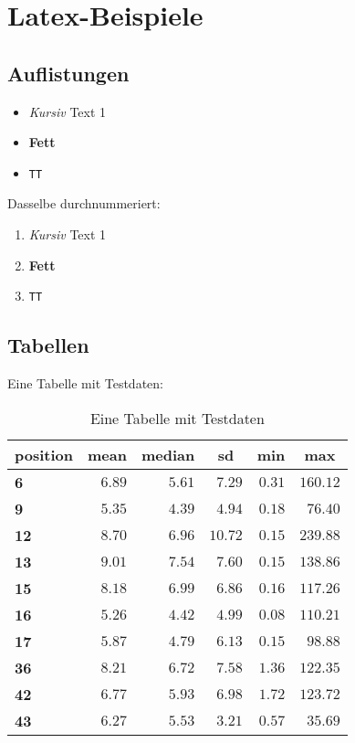
\chapter{Latex-Beispiele}
\label{chap:bsp}

\section{Auflistungen}

\begin{itemize}
	\item \textit{Kursiv} Text 1
	\item \textbf{Fett}  
	\item \texttt{TT} 
\end{itemize}

Dasselbe durchnummeriert:

\begin{enumerate}
	\item \textit{Kursiv} Text 1
	\item \textbf{Fett}  
	\item \texttt{TT} 
\end{enumerate}

\newpage
\section{Tabellen}

Eine Tabelle mit Testdaten:


\begin{table}[H]
	\begin{center}
		\begin{tabular}{lrrrrr}\hline\hline
			\multicolumn{1}{l}{\textbf{position}}&
			\multicolumn{1}{c}{\textbf{mean}}&
			\multicolumn{1}{c}{\textbf{median}}&
			\multicolumn{1}{c}{\textbf{sd}}&
			\multicolumn{1}{c}{\textbf{min}}&
			\multicolumn{1}{c}{\textbf{max}}
			\\ \hline
			\textbf{6}&$6.89$&$5.61$&$ 7.29$&$0.31$&$160.12$\\
			\textbf{9}&$5.35$&$4.39$&$ 4.94$&$0.18$&$ 76.40$\\
			\textbf{12}&$8.70$&$6.96$&$10.72$&$0.15$&$239.88$\\
			\textbf{13}&$9.01$&$7.54$&$ 7.60$&$0.15$&$138.86$\\
			\textbf{15}&$8.18$&$6.99$&$ 6.86$&$0.16$&$117.26$\\
			\textbf{16}&$5.26$&$4.42$&$ 4.99$&$0.08$&$110.21$\\
			\textbf{17}&$5.87$&$4.79$&$ 6.13$&$0.15$&$ 98.88$\\
			\textbf{36}&$8.21$&$6.72$&$ 7.58$&$1.36$&$122.35$\\
			\textbf{42}&$6.77$&$5.93$&$ 6.98$&$1.72$&$123.72$\\
			\textbf{43}&$6.27$&$5.53$&$ 3.21$&$0.57$&$ 35.69$\\
			\hline
		\end{tabular}
	\end{center}
	\caption{Eine Tabelle mit Testdaten} 
	\label{tabelle:test}
\end{table}


